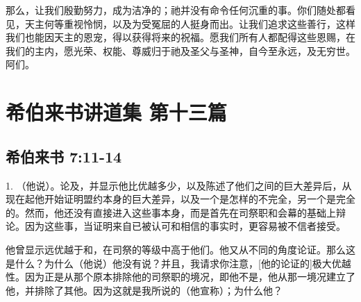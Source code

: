 那么，让我们殷勤努力，成为洁净的；祂并没有命令任何沉重的事。你们随处都看见，天主何等重视怜悯，以及为受冤屈的人挺身而出。让我们追求这些善行，这样我们也能因天主的恩宠，得以获得将来的祝福。愿我们所有人都配得这些恩赐，在我们的主内，愿光荣、权能、尊威归于祂及圣父与圣神，自今至永远，及无穷世。阿们。\par



\section{希伯来书讲道集 第十三篇}


\subsection{希伯来书 7:11-14}

\par

1. （他说）。论及，并显示他比优越多少，以及陈述了他们之间的巨大差异后，从现在起他开始证明盟约本身的巨大差异，以及一个是怎样的不完全，另一个是完全的。然而，他还没有直接进入这些事本身，而是首先在司祭职和会幕的基础上辩论。因为这些事，当证明来自已被认可和相信的事实时，更容易被不信者接受。\par

他曾显示远优越于和，在司祭的等级中高于他们。他又从不同的角度论证。那么这是什么？为什么（他说）他没有说？并且，我请求你注意，[他的论证的]极大优越性。因为正是从那个原本排除他的司祭职的境况，即他不是，他从那一境况建立了他，并排除了其他。因为这就是我所说的（他宣称）；为什么他？\par

